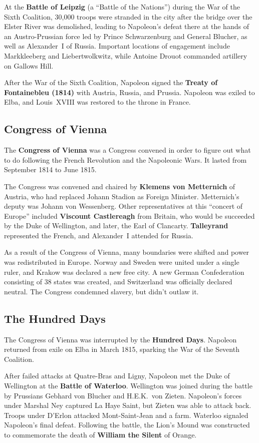At the \textbf{Battle of Leipzig} (a ``Battle of the Nations'') during the War of the Sixth Coalition,
30,000 troops were stranded in the city after the bridge over the Elster River was demolished,
leading to Napoleon's defeat there at the hands of an Austro-Prussian force
led by Prince Schwarzenburg and General Blucher, as well as Alexander~I of Russia.
Important locations of engagement include Markkleeberg and Liebertwolkwitz,
while Antoine Drouot commanded artillery on Gallows Hill.

After the War of the Sixth Coalition,
Napoleon signed the \textbf{Treaty of Fontainebleu (1814)} with Austria, Russia, and Prussia.
Napoleon was exiled to Elba, and Louis~XVIII was restored to the throne in France.

\subsection*{Congress of Vienna}

The \textbf{Congress of Vienna} was a Congress convened in order to figure out what to do
following the French Revolution and the Napoleonic Wars.
It lasted from September 1814 to June 1815.

The Congress was convened and chaired by \textbf{Klemens von Metternich} of Austria,
who had replaced Johann Stadion as Foreign Minister.
Metternich's deputy was Johann von Wessenberg.
Other representatives at this ``concert of Europe'' included
\textbf{Viscount Castlereagh} from Britain,
who would be succeeded by the Duke of Wellington,
and later, the Earl of Clancarty.
\textbf{Talleyrand} represented the French, and Alexander~I attended for Russia.

As a result of the Congress of Vienna, many boundaries were shifted and power was redistributed in Europe.
Norway and Sweden were united under a single ruler, and Krakow was declared a new free city.
A new German Confederation consisting of 38 states was created, and Switzerland was officially declared neutral.
The Congress condemned slavery, but didn't outlaw it.

\subsection*{The Hundred Days}

The Congress of Vienna was interrupted by the \textbf{Hundred Days}.
Napoleon returned from exile on Elba in March 1815,
sparking the War of the Seventh Coalition.

After failed attacks at Quatre-Bras and Ligny,
Napoleon met the Duke of Wellington at the \textbf{Battle of Waterloo}.
Wellington was joined during the battle by Prussians Gebhard von Blucher and H.E.K.\ von Zieten.
Napoleon's forces under Marshal Ney captured La Haye Saint, but Zieten was able to attack back.
Troops under D'Erlon attacked Mont-Saint-Jean and a farm.
Waterloo signaled Napoleon's final defeat.
Following the battle,
the Lion's Mound was constructed to commemorate the death of \textbf{William the Silent} of Orange.

